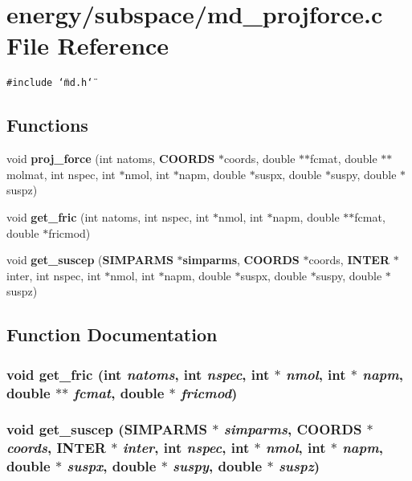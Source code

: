 \section{energy/subspace/md\_\-projforce.c File Reference}
\label{subspace_2md__projforce_8c}
{\tt \#include \char`\"{}md.h\char`\"{}}\par
\subsection*{Functions}
\begin{CompactItemize}
\item 
void {\bf proj\_\-force} (int natoms, {\bf COORDS} $\ast$coords, double $\ast$$\ast$fcmat, double $\ast$$\ast$molmat, int nspec, int $\ast$nmol, int $\ast$napm, double $\ast$suspx, double $\ast$suspy, double $\ast$suspz)
\item 
void {\bf get\_\-fric} (int natoms, int nspec, int $\ast$nmol, int $\ast$napm, double $\ast$$\ast$fcmat, double $\ast$fricmod)
\item 
void {\bf get\_\-suscep} ({\bf SIMPARMS} $\ast${\bf simparms}, {\bf COORDS} $\ast$coords, {\bf INTER} $\ast$inter, int nspec, int $\ast$nmol, int $\ast$napm, double $\ast$suspx, double $\ast$suspy, double $\ast$suspz)
\end{CompactItemize}


\subsection{Function Documentation}
\subsubsection{\setlength{\rightskip}{0pt plus 5cm}void get\_\-fric (int {\em natoms}, int {\em nspec}, int $\ast$ {\em nmol}, int $\ast$ {\em napm}, double $\ast$$\ast$ {\em fcmat}, double $\ast$ {\em fricmod})}\label{subspace_2md__projforce_8c_33ed24cde634e1414e184606a1f18840}


\subsubsection{\setlength{\rightskip}{0pt plus 5cm}void get\_\-suscep ({\bf SIMPARMS} $\ast$ {\em simparms}, {\bf COORDS} $\ast$ {\em coords}, {\bf INTER} $\ast$ {\em inter}, int {\em nspec}, int $\ast$ {\em nmol}, int $\ast$ {\em napm}, double $\ast$ {\em suspx}, double $\ast$ {\em suspy}, double $\ast$ {\em suspz})}\label{subspace_2md__projforce_8c_9cdae3e62f004d3ad244c1e68d5770ff}


